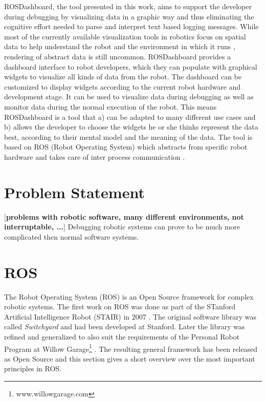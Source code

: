 ROSDashboard, the tool presented in this work, aims to support the developer during debugging by visualizing data in a graphic way and thus eliminating the cognitive effort needed to parse and interpret text based logging messages. While most of the currently available visualization tools in robotics focus on spatial data to help understand the robot and the environment in which it runs \cite{Collett2010, Quigley2009}, rendering of abstract data is still uncommon. ROSDashboard provides a dashboard interface to robot developers, which they can populate with graphical widgets to visualize all kinds of data from the robot. The dashboard can be customized to display widgets according to the current robot hardware and development stage. It can be used to visualize data during debugging as well as monitor data during the normal execution of the robot. This means ROSDashboard is a tool that a) can be adapted to many different use cases and b) allows the developer to choose the widgets he or she thinks represent the data best, according to their mental model and the meaning of the data. The tool is based on ROS (Robot Operating System) which abstracts from specific robot hardware and takes care of inter process communication \cite{Quigley2009}.

\section{Problem Statement}
\label{problem_statement}
[\textbf{problems with robotic software, many different environments, not interruptable, ...}]
Debugging robotic systems can prove to be much more complicated then normal software systems. 

\section{ROS}
The Robot Operating System (ROS) is an Open Source framework for complex robotic systems. The first work on ROS was done as part of the STanford Artificial Intelligence Robot (STAIR) in 2007 \cite{Quigley2007}. The original software library was called \emph{Switchyard} and had been developed at Stanford. Later the library was refined and generalized to also suit the requirements of the Personal Robot Program at Willow Garage\footnote{www.willowgarage.com} \cite{Quigley2009}. The resulting general framework has been released as Open Source \cite{Quigley2009} and this section gives a short overview over the most important principles in ROS.

